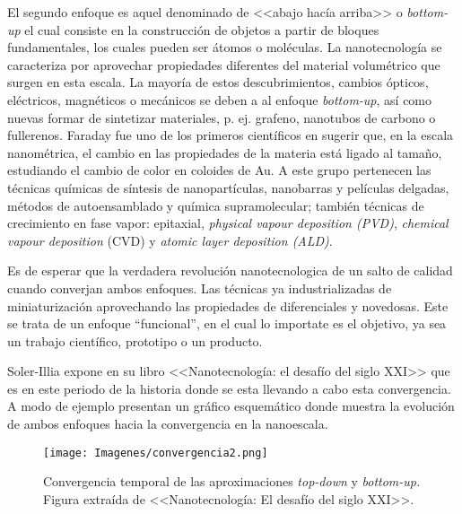 	El segundo enfoque es aquel denominado de <<abajo hacía arriba>> o \textit{bottom-up} el cual consiste en la construcción de objetos a partir de bloques fundamentales, los cuales pueden ser átomos o moléculas. La nanotecnología se caracteriza por aprovechar propiedades diferentes del material volumétrico que surgen en esta escala. La mayoría de estos descubrimientos, cambios ópticos, eléctricos, magnéticos o mecánicos se deben a al enfoque \textit{bottom-up}, así como nuevas formar de sintetizar materiales, p. ej. grafeno, nanotubos de carbono o fullerenos. Faraday fue uno de los primeros científicos en sugerir que, en la escala nanométrica, el cambio en las propiedades de la materia está ligado al tamaño, estudiando el cambio de color en coloides de Au\cite{faraday1857}. A este grupo pertenecen las técnicas químicas de síntesis de nanopartículas, nanobarras y películas delgadas, métodos de autoensamblado y química supramolecular; también técnicas de crecimiento en fase vapor: epitaxial, \textit{physical vapour deposition (PVD)}, \textit{chemical vapour deposition} (CVD) y \textit{atomic layer deposition (ALD)}.
			
	Es de esperar que la verdadera revolución nanotecnologica de un salto de calidad cuando converjan ambos enfoques. Las técnicas ya industrializadas de miniaturización aprovechando las propiedades de diferenciales y novedosas. Este se trata de un enfoque ``funcional'', en el cual lo importate es el objetivo, ya sea un trabajo científico, prototipo o un producto.

	Soler-Illia expone en su libro <<Nanotecnología: el desafío del siglo XXI>>\cite{nanotecnologia-galo} que es en este periodo de la historia donde se esta llevando a cabo esta convergencia. A modo de ejemplo presentan un gráfico esquemático donde muestra la evolución de ambos enfoques hacia la convergencia en la nanoescala.

			\begin{figure}[ht!]
 				\begin{center}
 				\texttt{[image: Imagenes/convergencia2.png]}
 				\caption[Convergencia \textit{top-down }y \textit{bottom-up.}]{Convergencia temporal de las aproximaciones \textit{top-down }y \textit{bottom-up.} Figura extraída de <<Nanotecnología: El desafío del siglo XXI>>.}
 				\label{fig:galo-convergencia}
 		   	    \end{center}
 		   	    \end{figure}

